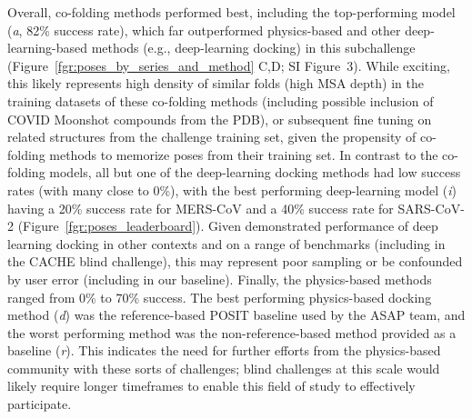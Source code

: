 \documentclass[journal=jcim,manuscript=article]{achemso}
\begin{document}
Overall, co-folding methods performed best, including the top-performing model (\textit{a}, 82\% success rate), which far outperformed physics-based and other deep-learning-based methods (e.g., deep-learning docking) in this subchallenge (Figure~\ref{fgr:poses_by_series_and_method} C,D; SI Figure~3). While exciting, this likely represents high density of similar folds (high MSA depth) in the training datasets of these co-folding methods (including possible inclusion of COVID Moonshot compounds from the PDB), or subsequent fine tuning on related structures from the challenge training set, given the propensity of co-folding methods to memorize poses from their training set\cite{skrinjar_cofold_mem_2025}. In contrast to the co-folding models, all but one of the deep-learning docking methods had low success rates (with many close to 0\%), with the best performing deep-learning model (\textit{i}) having a 20\% success rate for MERS-CoV and a 40\% success rate for SARS-CoV-2 (Figure~\ref{fgr:poses_leaderboard}). Given demonstrated performance of deep learning docking in other contexts and on a range of benchmarks (including in the CACHE blind challenge\cite{dunn_cache_2024}), this may represent poor sampling or be confounded by user error (including in our baseline).  Finally, the physics-based methods ranged from 0\% to 70\% success. The best performing physics-based docking method (\textit{d}) was the reference-based POSIT baseline used by the ASAP team, and the worst performing method was the non-reference-based method provided as a baseline (\textit{r}). This indicates the need for further efforts from the physics-based community with these sorts of challenges; blind challenges at this scale would likely require longer timeframes to enable this field of study to effectively participate.
\end{document}

